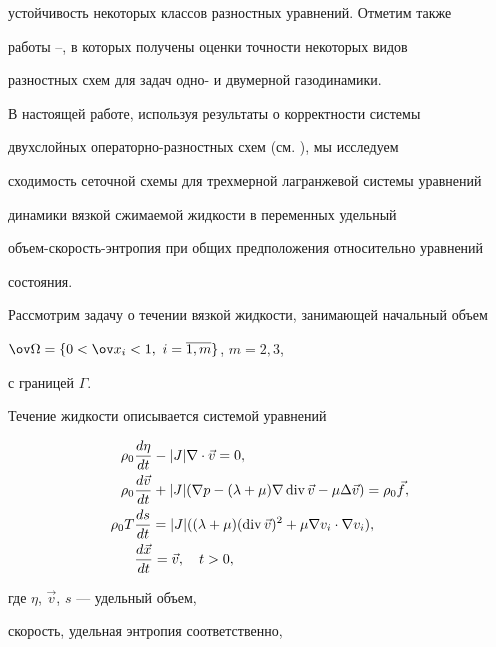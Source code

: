 устойчивость некоторых классов разностных уравнений. Отметим также 


работы \cite{12}--\cite{16}, в которых получены оценки точности некоторых видов 


разностных схем для задач одно- и двумерной газодинамики. 


В настоящей работе, используя результаты о корректности системы 


двухслойных операторно-разностных схем (см. \cite{F}), мы исследуем


сходимость сеточной схемы для трехмерной лагранжевой системы уравнений 


динамики вязкой сжимаемой жидкости в переменных удельный 


объем-скорость-энтропия при общих предположения относительно уравнений 


состояния.  





Рассмотрим задачу о течении вязкой жидкости, занимающей начальный объем


$\ov\Omega=\linebreak \{0<\ov x_i<1,\ i=\overline{1,m}\}$, $m=2,3$,


с границей $\Gamma$.


Течение жидкости описывается системой уравнений


\begin{align}


\rho_0&\frac{d\eta}{dt}-|J|\nabla\cdot \Vec v=0,


\label{nerazd} \\


\rho_0&\frac{d\Vec v}{dt}+|J|(\nabla p-(\lambda+\mu)\nabla\Div\Vec v-


\mu \Delta \Vec v )=\rho_0\Vec f,


\label{dvizd} \\


\rho_0 T&\frac{ds}{dt}=|J|((\lambda+\mu)(\Div \Vec v)^2+


\mu \nabla v_i \cdot \nabla v_i),


\label{energd}\\


&\frac{d\Vec x}{dt}=\Vec v,\quad t>0,


\label{x-v}


\end{align}


где $\eta$, $\Vec v$, $s$ --- удельный объем,


скорость, удельная энтропия соответственно,


